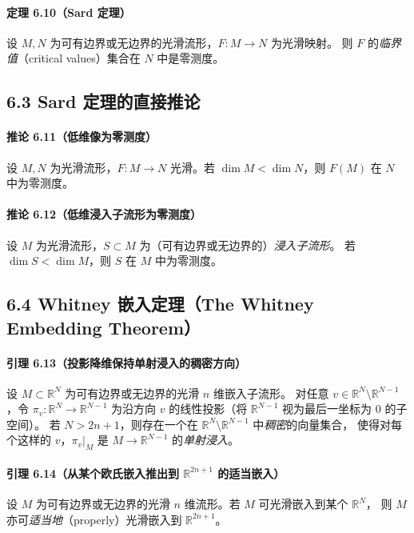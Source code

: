 \documentclass[11pt,a4paper]{article}
\begin{document}
\paragraph{定理 6.10（Sard 定理）}
设 $M,N$ 为可有边界或无边界的光滑流形，$F:M\to N$ 为光滑映射。
则 $F$ 的\emph{临界值}（critical values）集合在 $N$ 中是零测度。

\subsection*{6.3 Sard 定理的直接推论}

\paragraph{推论 6.11（低维像为零测度）}
设 $M,N$ 为光滑流形，$F:M\to N$ 光滑。若 $\dim M<\dim N$，则 $F(M)$ 在 $N$ 中为零测度。

\paragraph{推论 6.12（低维浸入子流形为零测度）}
设 $M$ 为光滑流形，$S\subset M$ 为（可有边界或无边界的）\emph{浸入子流形}。
若 $\dim S<\dim M$，则 $S$ 在 $M$ 中为零测度。

\subsection*{6.4 Whitney 嵌入定理（The Whitney Embedding Theorem）}

\paragraph{引理 6.13（投影降维保持单射浸入的稠密方向）}
设 $M\subset\mathbb R^N$ 为可有边界或无边界的光滑 $n$ 维嵌入子流形。
对任意 $v\in\mathbb R^N\setminus\mathbb R^{N-1}$，令 $\pi_v:\mathbb R^N\to\mathbb R^{N-1}$
为沿方向 $v$ 的线性投影（将 $\mathbb R^{N-1}$ 视为最后一坐标为 $0$ 的子空间）。
若 $N>2n+1$，则存在一个在 $\mathbb R^N\setminus\mathbb R^{N-1}$ 中\emph{稠密}的向量集合，
使得对每个这样的 $v$，$\pi_v|_M$ 是 $M\to\mathbb R^{N-1}$ 的\emph{单射浸入}。

\paragraph{引理 6.14（从某个欧氏嵌入推出到 $\mathbb R^{2n+1}$ 的适当嵌入）}
设 $M$ 为可有边界或无边界的光滑 $n$ 维流形。若 $M$ 可光滑嵌入到某个 $\mathbb R^N$，
则 $M$ 亦可\emph{适当地}（properly）光滑嵌入到 $\mathbb R^{2n+1}$。
\end{document}
